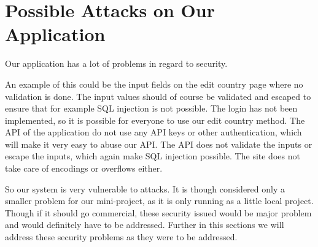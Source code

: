\section{Possible Attacks on Our Application}
Our application has a lot of problems in regard to security.

An example of this could be the input fields on the edit country page where no validation is done. The input values should of course be validated and escaped to ensure that for example SQL injection is not possible.
The login has not been implemented, so it is possible for everyone to use our edit country method. The API of the application do not use any API keys or other authentication, which will make it very easy to abuse our API. The API does not validate the inputs or escape the inputs, which again make SQL injection possible. The site does not take care of encodings or overflows either.

So our system is very vulnerable to attacks. It is though considered only a smaller problem for our mini-project, as it is only running as a little local project. Though if it should go commercial, these security issued would be major problem and would definitely have to be addressed. Further in this sections we will address these security problems as they were to be addressed.